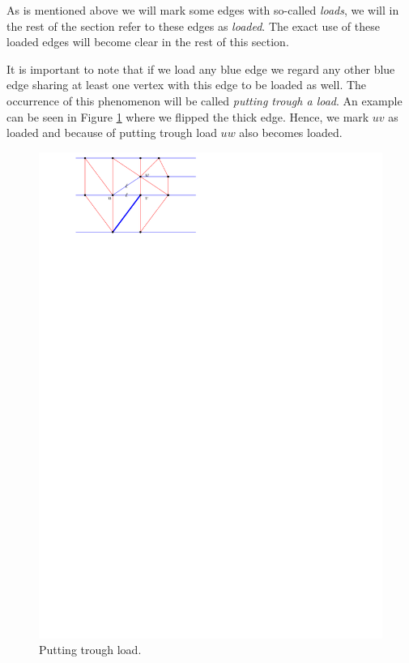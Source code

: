   As is mentioned above we will mark some edges with so-called \emph{loads}, we will in the rest of the section refer to these edges as \emph{loaded}.
  The exact use of these loaded edges will become clear in the rest of this section.

  It is important to note that if we load any blue edge we regard any other blue edge sharing at least one vertex with this edge to be loaded as well.
  The occurrence of this phenomenon will be called \emph{putting trough a load}.
  An example can be seen in Figure \ref{fig:subdiv:putTrougLoad} where we flipped the thick edge.
  Hence, we mark $uv$ as loaded and because of putting trough load $uw$ also becomes loaded.

  \begin{figure}[h]
    \centering
    \includegraphics[scale=1]{blueFaceSubdivision/img/puttingTroughLoad.pdf}
    \caption{Putting trough load.}
    \label{fig:subdiv:putTrougLoad}
  \end{figure}


